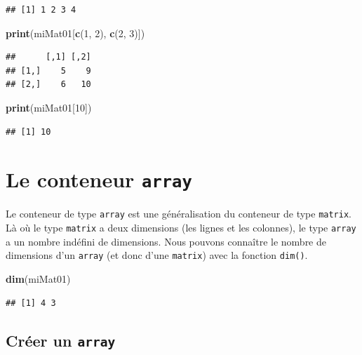 \documentclass[twoside,symmetric]{book}
\newenvironment{Shaded}{}{}
\newcommand{\DecValTok}[1]{#1}
\newcommand{\KeywordTok}[1]{\textbf{#1}}
\newcommand{\NormalTok}[1]{#1}
\begin{document}
\begin{verbatim}
## [1] 1 2 3 4
\end{verbatim}

\begin{Shaded}
\begin{Highlighting}[]
\KeywordTok{print}\NormalTok{(miMat01[}\KeywordTok{c}\NormalTok{(}\DecValTok{1}\NormalTok{, }\DecValTok{2}\NormalTok{), }\KeywordTok{c}\NormalTok{(}\DecValTok{2}\NormalTok{, }\DecValTok{3}\NormalTok{)])}
\end{Highlighting}
\end{Shaded}

\begin{verbatim}
##      [,1] [,2]
## [1,]    5    9
## [2,]    6   10
\end{verbatim}

\begin{Shaded}
\begin{Highlighting}[]
\KeywordTok{print}\NormalTok{(miMat01[}\DecValTok{10}\NormalTok{])}
\end{Highlighting}
\end{Shaded}

\begin{verbatim}
## [1] 10
\end{verbatim}

\hypertarget{l014array}{%
\section{\texorpdfstring{Le conteneur \texttt{array}}{Le conteneur array}}\label{l014array}}

Le conteneur de type \texttt{array} est une généralisation du conteneur de type \texttt{matrix}. Là où le type \texttt{matrix} a deux dimensions (les lignes et les colonnes), le type \texttt{array} a un nombre indéfini de dimensions. Nous pouvons connaître le nombre de dimensions d'un \texttt{array} (et donc d'une \texttt{matrix}) avec la fonction \texttt{dim()}.

\begin{Shaded}
\begin{Highlighting}[]
\KeywordTok{dim}\NormalTok{(miMat01)}
\end{Highlighting}
\end{Shaded}

\begin{verbatim}
## [1] 4 3
\end{verbatim}

\hypertarget{cruxe9er-un-array}{%
\subsection{\texorpdfstring{Créer un \texttt{array}}{Créer un array}}\label{cruxe9er-un-array}}
\end{document}
